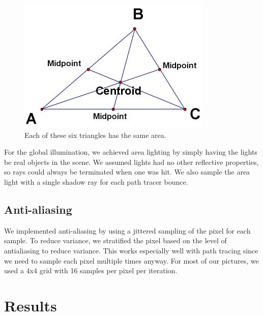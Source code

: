 \documentclass[11pt]{article}
\begin{document}
\begin{figure}
	\begin{center}
		\includegraphics[width=.5\linewidth]{figs/centroid}
		\caption{Each of these six triangles has the same area.}
	\end{center}
\end{figure}

For the global illumination, we achieved area lighting by simply having the lights be real objects in the scene. We assumed lights had no other reflective properties, so rays could always be terminated when one was hit. We also sample the area light with a single shadow ray for each path tracer bounce.

\subsection{Anti-aliasing}

We implemented anti-aliasing by using a jittered sampling of the pixel for each sample. To reduce variance, we stratified the pixel based on the level of antialiasing to reduce variance. This works especially well with path tracing since we need to sample each pixel multiple times anyway. For most of our pictures, we used a 4x4 grid with 16 samples per pixel per iteration. 

\section{Results}
\end{document}
